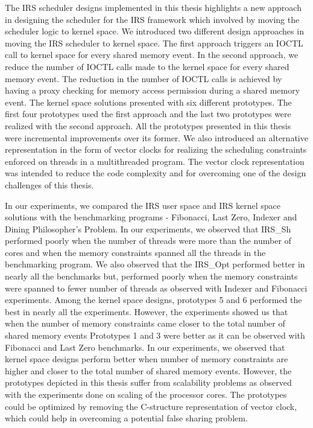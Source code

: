 The IRS scheduler designs implemented in this thesis highlights a new approach in designing the scheduler for the IRS framework which involved by  moving the scheduler logic to kernel space. 
We introduced two different design approaches in moving the IRS scheduler to kernel space. 
The first approach triggers an IOCTL call to kernel space for every shared memory event.
In the second approach, we reduce the number of IOCTL calls made to the kernel space for every shared memory event. 
The reduction in the number of IOCTL calls is achieved by having a proxy checking for memory access permission during a shared memory event. 
The kernel space solutions presented with six different prototypes. 
The first four prototypes used the first approach and the last two prototypes were realized with the second approach. 
All the prototypes presented in this thesis were incremental improvements over its former.
We also introduced an alternative representation in the form of vector clocks for realizing the scheduling constraints enforced on threads in a multithreaded program. 
The vector clock representation was intended to reduce the code complexity and for overcoming one of the design challenges of this thesis. 

In our experiments, we compared the IRS user space and IRS kernel space solutions with the benchmarking programs - Fibonacci, Last Zero, Indexer and Dining Philosopher's Problem. 
In our experiments, we observed that IRS\_Sh performed poorly when the number of threads were more than the number of cores and when the memory constraints spanned all the threads in the benchmarking program. 
We also observed that the IRS\_Opt performed better in nearly all the benchmarks but, performed poorly when the memory constraints were spanned to fewer number of threads as observed with Indexer and Fibonacci experiments. 
Among the kernel space designs, prototypes 5 and 6 performed the best in nearly all the experiments. 
However, the experiments showed us that when the number of memory constraints came closer to the total number of shared memory events Prototypes 1 and 3 were better as it can be observed with Fibonacci and Last Zero benchmarks. 
In our experiments, we observed that kernel space designs perform better when number of memory constraints are higher and closer to the total number of shared memory events. 
However, the prototypes depicted in this thesis suffer from scalability problems as observed with the experiments done on scaling of the processor cores. 
The prototypes could be optimized by removing the C-structure representation of vector clock, which could help in overcoming a potential false sharing problem. 

